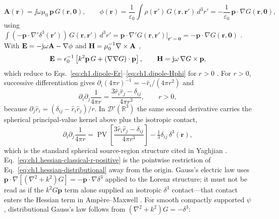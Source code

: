 \begin{equation}
\label{eq:ch1.dipole-A-from-source}
\mathbf{A}(\mathbf{r})=\jj\omega\mu_0\,\mathbf{p}\,G(\mathbf{r},\mathbf{0}),
\qquad
\phi(\mathbf{r})=\frac{1}{\varepsilon_0}\int \rho(\mathbf{r}')\,G(\mathbf{r},\mathbf{r}')\,d^3r'
=-\frac{1}{\varepsilon_0}\,\mathbf{p}\cdot\nabla G(\mathbf{r},\mathbf{0}),
\end{equation}
using $\int (-\mathbf{p}\cdot\nabla'\delta^{3}(\mathbf{r}'))\,G(\mathbf{r},\mathbf{r}')\,d^3r'=\mathbf{p}\cdot\nabla' G(\mathbf{r},\mathbf{r}')|_{\mathbf{r}'=\mathbf{0}}=-\mathbf{p}\cdot\nabla G(\mathbf{r},\mathbf{0})$ \cite{jackson1999,stratton1941}. With $\mathbf{E}=-\mathrm{j}\omega\mathbf{A}-\nabla\phi$ and $\mathbf{H}=\mu_0^{-1}\nabla\times\mathbf{A}$ \cite{jackson1999,stratton1941},
\begin{equation}
\label{eq:ch1.dipole-E-dyadic-distributional}
\mathbf{E}=\epsilon_0^{-1}\left[k^{2}\mathbf{p}\,G+(\nabla\nabla G)\cdot\mathbf{p}\right],
\qquad
\mathbf{H}=\mathrm{j}\omega\,\nabla G\times\mathbf{p},
\end{equation}
which reduce to Eqs.~\eqref{eq:ch1.dipole-Er}--\eqref{eq:ch1.dipole-Hphi} for $r>0$ \cite{stratton1941,harrington2001,yaghjian1982}. For $r>0$, successive differentiation gives $\partial_i(4\pi r)^{-1}=-\hat r_i/(4\pi r^2)$ and
\begin{equation}
\label{eq:ch1.hessian-classical-r-positive}
\partial_i\partial_j\frac{1}{4\pi r}
=\frac{3\hat r_i\hat r_j-\delta_{ij}}{4\pi r^{3}},
\qquad r>0,
\end{equation}
because $\partial_j\hat r_i=(\delta_{ij}-\hat r_i\hat r_j)/r$. In $\mathcal{D}'(\mathbb{R}^{3})$ the same second derivative carries the spherical principal-value kernel above plus the isotropic contact,
\begin{equation}
\label{eq:ch1.hessian-distributional}
\partial_i\partial_j\frac{1}{4\pi r}
=\operatorname{PV}\!\left[\frac{3\hat r_i\hat r_j-\delta_{ij}}{4\pi r^{3}}\right]
-\tfrac13\delta_{ij}\,\delta^{3}(\mathbf{r}),
\end{equation}
which is the standard spherical source-region structure cited in Yaghjian \cite{yaghjian1980dyadic,yaghjian1982}. Eq.~\eqref{eq:ch1.hessian-classical-r-positive} is the pointwise restriction of Eq.~\eqref{eq:ch1.hessian-distributional} away from the origin. Gauss's electric law uses $\mathbf{p}\cdot\nabla[(\nabla^2+k^2)G]=-\mathbf{p}\cdot\nabla\delta^{3}$ applied to the Lorenz structure; it must not be read as if the $k^{2}G\mathbf{p}$ term alone supplied an isotropic $\delta^{3}$ contact---that contact enters the Hessian term in Amp\`ere--Maxwell \cite{yaghjian1980dyadic,yaghjian1982}. For smooth compactly supported $\psi$, distributional Gauss's law follows from $(\nabla^2+k^2)G=-\delta^{3}$:
